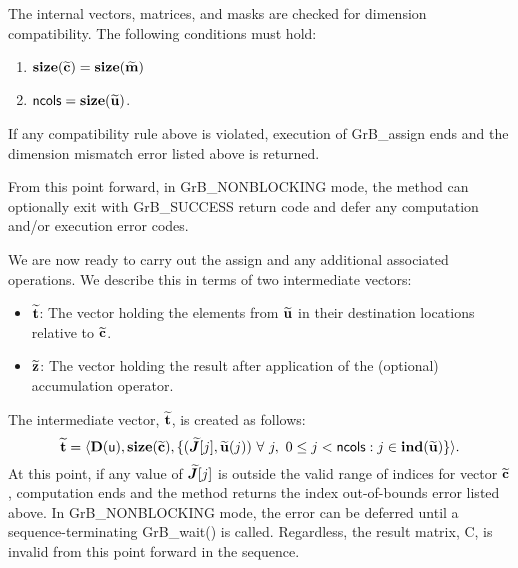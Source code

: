 The internal vectors, matrices, and masks are checked for dimension compatibility. 
The following conditions must hold:
\begin{enumerate}
    \item $\bold{size}({\bf \widetilde{c}}) = \bold{size}({\bf \widetilde{m}})$
    \item ${\sf ncols} = \bold{size}({\bf \widetilde{u}})$.
\end{enumerate}
If any compatibility rule above is violated, execution of {\sf GrB\_assign} ends and 
the dimension mismatch error listed above is returned.

From this point forward, in {\sf GrB\_NONBLOCKING} mode, the method can 
optionally exit with {\sf GrB\_SUCCESS} return code and defer any computation 
and/or execution error codes.

We are now ready to carry out the assign and any additional 
associated operations.  We describe this in terms of two intermediate vectors:
\begin{itemize}
    \item ${\bf \widetilde{t}}$: The vector holding the elements from
    ${\bf \widetilde{u}}$ in their destination locations relative to 
    ${\bf \widetilde{c}}$.

    \item ${\bf \widetilde{z}}$: The vector holding the result after 
    application of the (optional) accumulation operator.
\end{itemize}

The intermediate vector, ${\bf \widetilde{t}}$, is created as follows:
\[
\vector{\widetilde{t}} = \langle
\bold{D}({\sf u}), \bold{size}(\vector{\widetilde{c}}),
\{(\grbarray{\widetilde{J}}[j],\vector{\widetilde{u}}(j)) \ \forall \ j, \ 
0 \leq j < {\sf ncols} : j \in \bold{ind}(\vector{\widetilde{u}}) \} \rangle. 
\]
At this point, if any value of $\bm{\widetilde{J}}[j]$ is outside the valid 
range of indices for vector ${\bf \widetilde{c}}$, computation ends and the 
method returns the index out-of-bounds error listed above. In 
{\sf GrB\_NONBLOCKING} mode, the error can be deferred until a 
sequence-terminating {\sf GrB\_wait()} is called.  Regardless, the result 
matrix, {\sf C}, is invalid from this point forward in the 
sequence.

